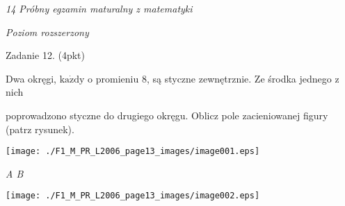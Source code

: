 \documentclass[a4paper,12pt]{article}
\begin{document}
{\it 14 Próbny egzamin maturalny z matematyki}

{\it Poziom rozszerzony}

Zadanie 12. (4pkt)

Dwa okręgi, $\mathrm{k}\mathrm{a}\dot{\mathrm{z}}\mathrm{d}\mathrm{y}$ o promieniu 8, są styczne zewnętrznie. Ze środka jednego z nich

poprowadzono styczne do drugiego okręgu. Oblicz pole zacieniowanej figury (patrz rysunek).
\begin{center}
\texttt{[image: ./F1\_M\_PR\_L2006\_page13\_images/image001.eps]}
\end{center}
{\it A  B}
\begin{center}
\texttt{[image: ./F1\_M\_PR\_L2006\_page13\_images/image002.eps]}
\end{center}
\end{document}
